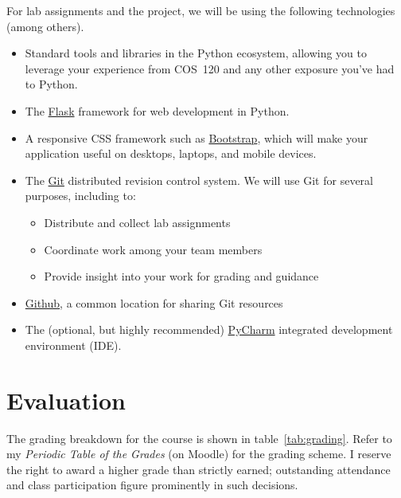 \documentclass[11pt]{article}
\begin{document}
For lab assignments and the project,
we will be using the following technologies (among others).
\begin{itemize}
\item Standard tools and libraries in the Python ecosystem,
  allowing you to leverage your experience
  from COS~120 and any other exposure you've had to Python.
\item The \href{http://flask.pocoo.org/}{Flask}
  framework for web development in Python.
\item A responsive CSS framework
  such as \href{https://getbootstrap.com/}{Bootstrap},
  which will make your application useful on
  desktops, laptops, and mobile devices.
\item The \href{https://git-scm.com/}{Git}
  distributed revision control system.
  We will use Git
  for several purposes, including to:
  \begin{itemize}
  \item Distribute and collect lab assignments
  \item Coordinate work among your team members
  \item Provide insight into your work for grading and guidance
  \end{itemize}
\item \href{https://github.com/}{Github},
  a common location for sharing Git resources
\item The (optional, but highly recommended)
  \href{https://www.jetbrains.com/pycharm/}{PyCharm}
  integrated development environment (IDE).
\end{itemize}

\section{Evaluation}

The grading breakdown for the course
is shown in table~\ref{tab:grading}.
Refer to my \emph{Periodic Table of the Grades} (on Moodle)
for the grading scheme.
I reserve the right to award a higher grade than strictly earned;
outstanding attendance and class participation
figure prominently in such decisions.
\end{document}

